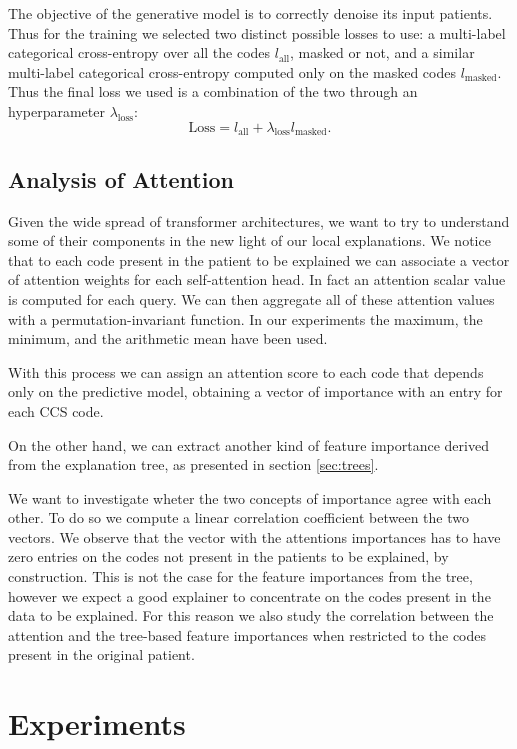\documentclass[]{marticle}
\begin{document}
The objective of the generative model is to correctly denoise its input patients.
Thus for the training we selected two distinct possible losses to use: a multi-label categorical
cross-entropy over all the codes $l_\text{all}$, masked or not, and a similar multi-label
categorical cross-entropy computed only on the masked codes $l_\text{masked}$. Thus the final loss we
used is a combination of the two through an hyperparameter $\lambda _\text{loss}$:
$$ \text{Loss} = l_\text{all} + \lambda_\text{loss} l_\text{masked}. $$

\subsection{Analysis of Attention}

Given the wide spread of transformer architectures, we want to try to understand some of their
components in the new light of our local explanations. We notice that to each code present in the
patient to be explained we can associate a vector of attention weights for each self-attention head.
In fact an attention scalar value is computed for each query. We can then aggregate all of these
attention values with a permutation-invariant function. In our experiments the maximum, the minimum,
and the arithmetic mean have been used.

With this process we can assign an attention score to each code that depends only on the predictive
model, obtaining a vector of importance with an entry for each CCS code.

On the other hand, we can extract another kind of feature importance derived from the explanation
tree, as presented in section \ref{sec:trees}.

We want to investigate wheter the two concepts of importance agree with each other. To do so we
compute a linear correlation coefficient between the two vectors. We observe that the vector with
the attentions importances has to have zero entries on the codes not present in the patients to be
explained, by construction. This is not the case for the feature importances from the tree, however
we expect a good explainer to concentrate on the codes present in the data to be explained. For this
reason we also study the correlation between the attention and the tree-based feature importances
when restricted to the codes present in the original patient.

\section{Experiments}
\end{document}
